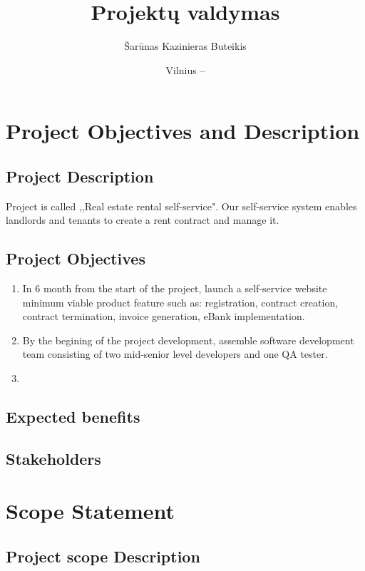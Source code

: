 \documentclass{VUMIFPSkursinis}
\title{Projektų valdymas}
\author{Šarūnas Kazinieras Buteikis}
\date{Vilnius – \the\year}
\begin{document}
\maketitle

\tableofcontents

\section{Project Objectives and Description}
	\subsection{Project Description}
		Project is called ,,Real estate rental self-service". 
		Our self-service system enables landlords and tenants to create a rent contract and manage it.

	\subsection{Project Objectives}
		\begin{enumerate}
			\item{In 6 month from the start of the project, launch a self-service website minimum viable product feature such as: registration, contract creation, contract termination, invoice generation, eBank implementation.}
			\item{By the begining of the project development, assemble software development team consisting of two mid-senior level developers and one QA tester.}
			\item{}

		\end{enumerate}

	\subsection{Expected benefits}

	\subsection{Stakeholders}


\section{Scope Statement}
	\subsection{Project scope Description}
\end{document}
